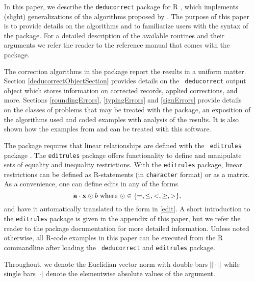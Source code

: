 \documentclass[11pt, fleqn, a4paper]{article}
\begin{document}
In this paper, we describe the {\tt deducorrect} package for R
\citep{R-core:2011}, which implements (slight) generalizations of the
algorithms proposed by \cite{scholtus:2008, scholtus:2009}. The purpose of this
paper is to provide details on the algorithms and to familiarize users with the
syntax of the package. For a detailed description of the available routines and
their arguments we refer the reader to the reference manual that comes with the
package.

The correction algorithms in the package report the results in a uniform
matter. Section \ref{deducorrectObjectSection} provides details on the {\tt
deducorrect} output object which stores information on corrected records,
applied corrections, and more. Sections \ref{roundingErrors},
\ref{typingErrors} and \ref{signErrors} provide details on the classes of
problems that may be treated with the package, an exposition of the algorithms
used and coded examples with analysis of the results. It is also shown how the
examples from \cite{scholtus:2008} and \cite{scholtus:2009} can be treated with
this software. 

The package requires that linear relationships are defined with the {\tt
editrules} package \citep{jonge:2011}.  The {\tt editrules} package offers
functionality to define and manipulate sets of equality and
inequality restrictions. With the {\tt editrules} package, linear restrictions
can be defined as R-statements (in {\tt character} format) or as a matrix. As
a convenience, one can define edits in any of the forms
\begin{equation}
{\bf a}\cdot{\bf x} \odot b\textrm{ where } \odot \in\{=,\leq,<,\geq,>\},
\end{equation}
and have it automatically translated to the form in \eqref{edit}. A
short introduction to the {\tt editrules} package is given in the appendix of
this paper, but we refer the reader to the package documentation for more
detailed information.  Unless noted otherwise, all R-code examples in this
paper can be executed from the R commandline after loading the {\tt
deducorrect} and {\tt editrules} package. 

Throughout, we denote the Euclidian vector norm with double bars $||\cdot||$
while single bars $|\cdot|$ denote the elementwise absolute values of the
argument.
\end{document}
